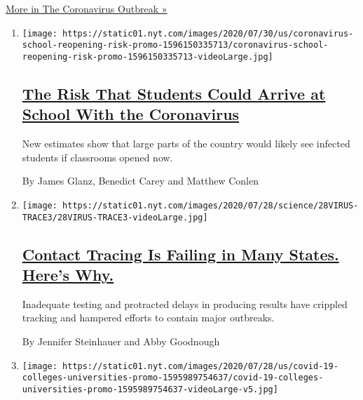 \href{/news-event/coronavirus}{More in The Coronavirus Outbreak »}

\begin{enumerate}
\def\labelenumi{\arabic{enumi}.}
\item
  \texttt{[image: https://static01.nyt.com/images/2020/07/30/us/coronavirus-school-reopening-risk-promo-1596150335713/coronavirus-school-reopening-risk-promo-1596150335713-videoLarge.jpg]}

  \hypertarget{the-risk-that-students-could-arrive-at-school-with-the-coronavirus}{%
  \subsection{\texorpdfstring{\href{/interactive/2020/07/31/us/coronavirus-school-reopening-risk.html}{The
  Risk That Students Could Arrive at School With the
  Coronavirus}}{The Risk That Students Could Arrive at School With the Coronavirus}}\label{the-risk-that-students-could-arrive-at-school-with-the-coronavirus}}

  New estimates show that large parts of the country would likely see
  infected students if classrooms opened now.

  By James Glanz, Benedict Carey and Matthew Conlen
\item
  \texttt{[image: https://static01.nyt.com/images/2020/07/28/science/28VIRUS-TRACE3/28VIRUS-TRACE3-videoLarge.jpg]}

  \hypertarget{contact-tracing-is-failing-in-many-states-heres-why}{%
  \subsection{\texorpdfstring{\href{/2020/07/31/health/covid-contact-tracing-tests.html}{Contact
  Tracing Is Failing in Many States. Here's
  Why.}}{Contact Tracing Is Failing in Many States. Here's Why.}}\label{contact-tracing-is-failing-in-many-states-heres-why}}

  Inadequate testing and protracted delays in producing results have
  crippled tracking and hampered efforts to contain major outbreaks.

  By Jennifer Steinhauer and Abby Goodnough
\item
  \texttt{[image: https://static01.nyt.com/images/2020/07/28/us/covid-19-colleges-universities-promo-1595989754637/covid-19-colleges-universities-promo-1595989754637-videoLarge-v5.jpg]}

  \hypertarget{more-than-6600-coronavirus-cases-have-been-linked-to-us-colleges}{%
}
\end{enumerate}
